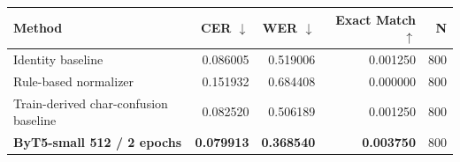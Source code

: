 \begin{tabular}{lrrrr}
\toprule
Method & CER $\downarrow$ & WER $\downarrow$ & Exact Match $\uparrow$ & N \\
\midrule
Identity baseline & 0.086005 & 0.519006 & 0.001250 & 800 \\
Rule-based normalizer & 0.151932 & 0.684408 & 0.000000 & 800 \\
Train-derived char-confusion baseline & 0.082520 & 0.506189 & 0.001250 & 800 \\
\textbf{ByT5-small 512 / 2 epochs} & \textbf{0.079913} & \textbf{0.368540} & \textbf{0.003750} & 800 \\
\bottomrule
\end{tabular}
